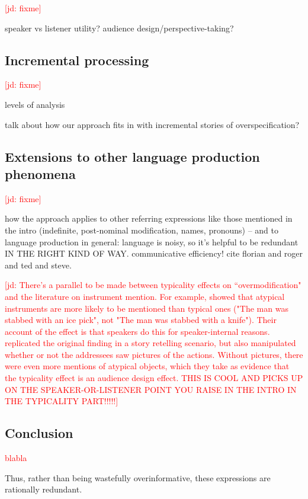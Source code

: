 \documentclass[11pt]{article}
\newcommand{\red}[1]{\textcolor{Red}{#1}}
\newcommand{\jd}[1]{\textcolor{Red}{[jd: #1]}}
\begin{document}
\jd{fixme}

speaker vs listener utility? audience design/perspective-taking?

\subsection{Incremental processing}

\jd{fixme}

levels of analysis

talk about how our approach fits in with incremental stories of overspecification?

\subsection{Extensions to other language production phenomena}

\jd{fixme}

how the approach applies to other referring expressions like those mentioned in the intro (indefinite, post-nominal modification, names, pronouns) -- and to language production in general: language is noisy, so it's helpful to be redundant IN THE RIGHT KIND OF WAY. communicative efficiency! cite florian and roger and ted and steve. 

\jd{There's a parallel to be made between typicality effects on ``overmodification" and the literature on instrument mention. For example, \cite{brown1987} showed that atypical instruments are more likely to be mentioned than typical ones ("The man was stabbed with an ice pick", not "The man was stabbed with a knife"). Their account of the effect is that speakers do this for speaker-internal reasons. \cite{lockridge2002} replicated the original finding in a story retelling scenario, but also manipulated whether or not the addressees saw pictures of the actions. Without pictures, there were even more mentions of atypical objects, which they take as evidence that the typicality effect is an audience design effect. THIS IS COOL AND PICKS UP ON THE SPEAKER-OR-LISTENER POINT YOU RAISE IN THE INTRO IN THE TYPICALITY PART!!!!!}

\subsection{Conclusion}
\label{sec:conclusion}

\red{blabla}

Thus, rather than being wastefully overinformative, these expressions are rationally redundant.
\end{document}
